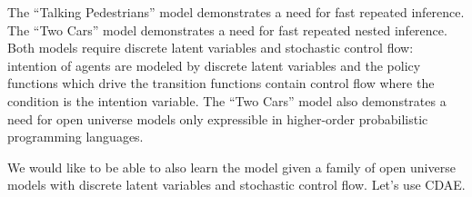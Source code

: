 \documentclass[a4paper]{article}
\begin{document}
The ``Talking Pedestrians'' model demonstrates a need for fast repeated inference.
The ``Two Cars'' model demonstrates a need for fast repeated nested inference.
Both models require discrete latent variables and stochastic control flow: intention of agents are modeled by discrete latent variables and the policy functions which drive the transition functions contain control flow where the condition is the intention variable.
The ``Two Cars'' model also demonstrates a need for open universe models only expressible in higher-order probabilistic programming languages.

We would like to be able to also learn the model given a family of open universe models with discrete latent variables and stochastic control flow.
Let's use CDAE.


\end{document}
